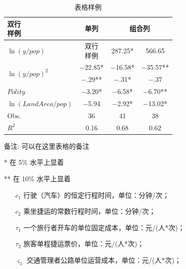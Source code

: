 \documentclass[a4paper,12pt]{ctexart}
\begin{document}
\begin{table}[htbp] %
  \centering\small
  \begin{threeparttable}
    \caption{表格样例}
    \begin{tabular}{lccc} %
      \toprule %
      \makecell[c]{双行                                                            \\ 样例}    &   单列 & \multicolumn{2}{c}{组合列} \\
      \midrule %
      $\ln(y/pop)$                    & \makecell[c]{双行                          \\ 样例}  &    287.25* &     566.65 \\
      \midrule %
      \multirow{2}{*}{$\ln(y/pop)^2$} & $-$22.85*         & $-$16.58* & $-$35.57** \\ \cline{2-4}
                                      & $-$.29**          & $-$.31*   & $-$.37     \\
      \midrule %
      $Polity$                        & $-$3.20*          & $-$6.58*  & $-$6.70**  \\
      \midrule %
      $\ln(LandArea/pop)$             & $-$5.94           & $-$2.92*  & $-$13.02*  \\
      \midrule %
      Obs.                            & 36                & 41        & 38         \\
      \midrule %
      $R^2$                           & 0.16              & 0.68      & 0.62       \\
      \bottomrule %
    \end{tabular}
    \small
    备注: 可以在这里表格的备注
    \begin{tablenotes}
      \item[*] 在 5\% 水平上显着
      \item[**] 在 10\% 水平上显着
    \end{tablenotes}
  \end{threeparttable}
\end{table}
\newpage

\begin{enumerate}[align=right]
  \setlength{\leftmargin}{2em} %
  \setlength{\parsep}{0ex} %
  \setlength{\topsep}{0ex} %
  \setlength{\itemsep}{0ex} %
  \setlength{\labelsep}{1em} %
  \setlength{\itemindent}{0em} %
  \setlength{\listparindent}{0em} %
  \item [ $c_1$] 行驶（汽车）的恒定行程时间，单位：分钟/次；
  \item [$c_2$] 乘坐捷运的常数行程时间，单位：分钟/次；
  \item [$\tau_1$] 一个旅行者开车的单位固定成本，单位：元/(人*次)；
  \item [$\tau_2$] 旅客单程捷运票价，单位：元/(人*次)；
  \item [$\varsigma_1$] 交通管理者公路单位运营成本，单位：元/(人*次)；
\end{enumerate}
\end{document}
